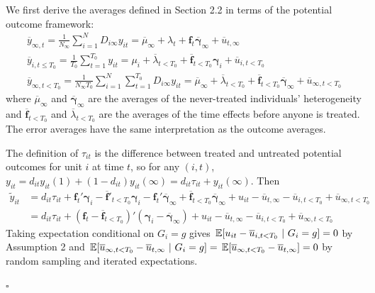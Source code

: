\documentclass[12pt]{article}
\begin{document}
We first derive the averages defined in Section 2.2 in terms of the potential outcome framework:
\begin{gather*}
    \overline{y}_{\infty , t} = \frac{1}{N_{\infty}} \sum_{i = 1}^N D_{i \infty} y_{it} = \overline{\mu}_{\infty} + \lambda_t + \bm f_t \overline{\bm \gamma}_{\infty} + \overline{u}_{t, \infty}\\
    \overline{y}_{i,t\leq T_0} = \frac{1}{T_0} \sum_{t = 1}^{T_0} y_{it} = \mu_i + \overline{\lambda}_{t < T_0} + \overline{\bm f}_{t < T_0} \bm \gamma_i + \overline{u}_{i,t < T_0}\\
    \overline{y}_{\infty, t < T_0} = \frac{1}{N_{\infty} T_0} \sum_{i = 1}^N \sum_{t = 1}^{T_0} D_{i \infty} y_{it} = \overline{\mu}_{\infty} + \overline{\lambda}_{t < T_0} + \overline{\bm f}_{t < T_0} \overline{\bm \gamma}_{\infty} + \overline{u}_{\infty, t < T_0}
\end{gather*}
where $\overline{\mu}_{\infty}$ and $\overline{\bm \gamma}_{\infty}$ are the averages of the never-treated individuals' heterogeneity and $\overline{\bm f}_{t < T_0}$ and $\overline{\lambda}_{t < T_0}$ are the averages of the time effects before anyone is treated. The error averages have the same interpretation as the outcome averages.

The definition of $\tau_{it}$ is the difference between treated and untreated potential outcomes for unit $i$ at time $t$, so for any $(i,t)$, $y_{it} = d_{it} y_{it}(1) + (1-d_{it})y_{it}(\infty) = d_{it} \tau_{it} + y_{it}(\infty)$. Then
\begin{align*}
    \tilde{y}_{it} 
    &= d_{it} \tau_{it} + \bm f_t' \bm \gamma_i - \overline{\bm f}'_{t < T_0} \bm \gamma_i - \bm f_t' \overline{\bm \gamma}_{\infty} + \overline{\bm f}_{t < T_0} \overline{\bm \gamma}_{\infty} + u_{it} - \overline{u}_{t,\infty} - \overline{u}_{i, t < T_0} + \overline{u}_{\infty, t < T_0}\\
    &= d_{it} \tau_{it} + (\bm f_t - \overline{\bm f}_{t < T_0})' (\bm \gamma_i - \overline{\bm \gamma}_{\infty}) + u_{it} - \overline{u}_{t,\infty} - \overline{u}_{i, t < T_0} + \overline{u}_{\infty, t < T_0}
\end{align*}
Taking expectation conditional on $G_i = g$ gives $\E{u_{it} - \overline{u}_{i, t < T_0}}{G_i = g} = 0$ by Assumption 2 and $\E{\overline{u}_{\infty, t < T_0} - \overline{u}_{t, \infty} }{G_i = g} = \expec{\overline{u}_{\infty, t < T_0} - \overline{u}_{t, \infty}} = 0$ by random sampling and iterated expectations.

$\square$
\end{document}
